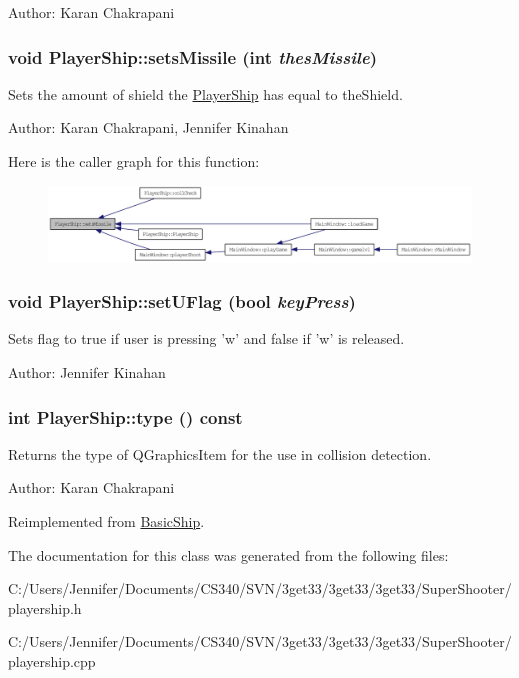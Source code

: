 Author: Karan Chakrapani \hypertarget{class_player_ship_a69f905cfd109b61000c2eaccb1741fae}{
\subsubsection[{setsMissile}]{\setlength{\rightskip}{0pt plus 5cm}void PlayerShip::setsMissile (int {\em thesMissile})}}
\label{class_player_ship_a69f905cfd109b61000c2eaccb1741fae}
Sets the amount of shield the \hyperlink{class_player_ship}{PlayerShip} has equal to theShield.

Author: Karan Chakrapani, Jennifer Kinahan 

Here is the caller graph for this function:\nopagebreak
\begin{figure}[H]
\begin{center}
\leavevmode
\includegraphics[width=408pt]{class_player_ship_a69f905cfd109b61000c2eaccb1741fae_icgraph}
\end{center}
\end{figure}
\hypertarget{class_player_ship_ac49a1a6d117dc84b84c8c6b3ad1ecd83}{
\subsubsection[{setUFlag}]{\setlength{\rightskip}{0pt plus 5cm}void PlayerShip::setUFlag (bool {\em keyPress})}}
\label{class_player_ship_ac49a1a6d117dc84b84c8c6b3ad1ecd83}
Sets flag to true if user is pressing 'w' and false if 'w' is released.

Author: Jennifer Kinahan \hypertarget{class_player_ship_a81bc25f1369bf55d02c3f71b312b70a4}{
\subsubsection[{type}]{\setlength{\rightskip}{0pt plus 5cm}int PlayerShip::type () const}}
\label{class_player_ship_a81bc25f1369bf55d02c3f71b312b70a4}
Returns the type of QGraphicsItem for the use in collision detection.

Author: Karan Chakrapani 

Reimplemented from \hyperlink{class_basic_ship_a6d498fc95af4562fcec7273897f98067}{BasicShip}.

The documentation for this class was generated from the following files:\begin{DoxyCompactItemize}
\item 
C:/Users/Jennifer/Documents/CS340/SVN/3get33/3get33/3get33/SuperShooter/playership.h\item 
C:/Users/Jennifer/Documents/CS340/SVN/3get33/3get33/3get33/SuperShooter/playership.cpp\end{DoxyCompactItemize}

